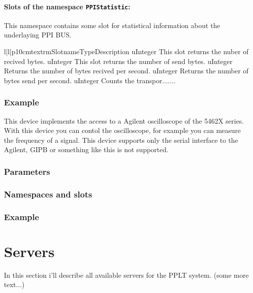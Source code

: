 \paragraph{Slots of the namespace \texttt{PPIStatistic}:}
This namespace contains some slot for statistical information about the 
underlaying PPI BUS. 
\begin{tableiii}{l|l|p{10cm}}{textrm}{Slotname}{Type}{Description}
        {uInteger}
        {This slot returns the nuber of recived bytes.}
        {uInteger}
        {This slot returns the number of send bytes.}
        {uInteger}
        {Returns the number of bytes recived per second.}
        {uInteger}
        {Returns the number of bytes send per second.}
        {uInteger}
        {Counts the transpor.......}
        
\subsubsection{Example}







This device implements the access to a Agilent oscilloscope of the 5462X 
series. With this device you can contol the oscilloscope, for example you can
measure the frequency of a signal. This device supports only the serial
interface to the Agilent, GIPB or something like this is not supported.

\subsubsection{Parameters}
\subsubsection{Namespaces and slots}
\subsubsection{Example}













\section{Servers}
In this section i'll describe all available servers for the PPLT system.
(some more text...)






\end{tableiii}
